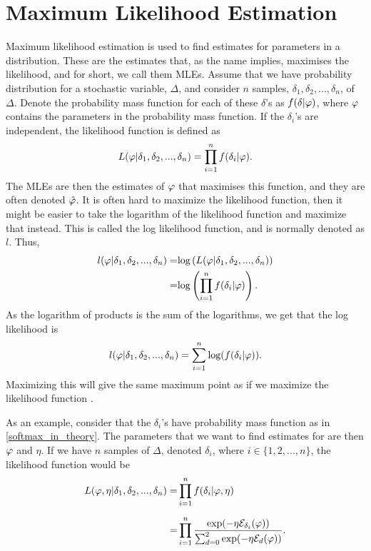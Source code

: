 \section{Maximum Likelihood Estimation}
\label{section_theory_mle}

Maximum likelihood estimation is used to find estimates for parameters in a distribution. These are the estimates that, as the name implies, maximises the likelihood, and for short, we call them MLEs. Assume that we have probability distribution for a stochastic variable, $\Delta$, and consider $n$ samples, $\delta_1,\delta_2,...,\delta_n$, of $\Delta$. Denote the probability mass function for each of these $\delta$'s as $f(\delta|\varphi)$, where $\varphi$ contains the parameters in the probability mass function. If the $\delta_i$'s are independent, the likelihood function is defined as
\begin{equation}
\label{likelihood}
    L(\varphi|\delta_1,\delta_2,...,\delta_n) =  \prod_{i=1}^{n} f(\delta_i|\varphi).
\end{equation} 
The MLEs are then the estimates of $\varphi$ that maximises this function, and they are often denoted $\hat{\varphi}$. It is often hard to maximize the likelihood function, then it might be easier to take the logarithm of the likelihood function and maximize that instead. This is called the log likelihood function, and is normally denoted as $l$. Thus,
\begin{equation}
\label{chap2:log_likelihood}
    \begin{aligned}
        l(\varphi|\delta_1,\delta_2,...,\delta_n) 
        =& \text{log}\left(L(\varphi|\delta_1,\delta_2,...,\delta_n)\right)\\
        =& \text{log}\left(\prod_{i=1}^{n} f(\delta_i|\varphi) \right).
    \end{aligned}
\end{equation}
As the logarithm of products is the sum of the logarithms, we get that the log likelihood is
\begin{equation}
\label{chap2:log_likelihood2}
    \begin{aligned}
        l(\varphi|\delta_1,\delta_2,...,\delta_n) = \sum_{i=1}^n \text{log}(f(\delta_i|\varphi)).
    \end{aligned}
\end{equation}
Maximizing this will give the same maximum point as if we maximize the likelihood function \citep{statinf}. 

As an example, consider that the $\delta_i$'s have probability mass function as in \eqref{softmax_in_theory}. The parameters that we want to find estimates for are then $\varphi$ and $\eta$. If we have $n$ samples of $\Delta$, denoted $\delta_i$, where $i \in \{1,2,...,n\}$,
the likelihood function would be
\begin{equation*}
    \begin{aligned}
        L(\varphi,\eta|\delta_1,\delta_2,...,\delta_n) 
        =& \prod_{i=1}^{n} f(\delta_i|\varphi,\eta)\\[6pt]
        =& \prod_{i=1}^{n}
        \frac{\text{exp}(- \eta \mathcal{E}_{\delta_i}(\varphi))}{\sum_{d=0}^{2} \text{exp}(-\eta \mathcal{E}_{d}(\varphi))}.
    \end{aligned}
\end{equation*}

